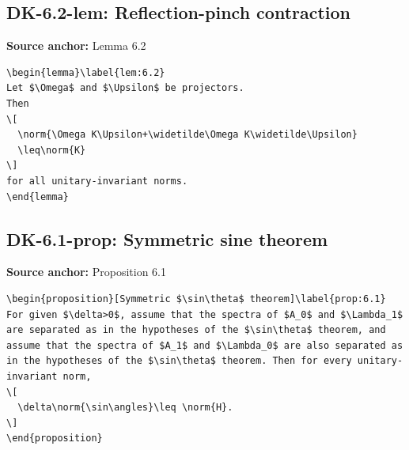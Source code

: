 \subsection*{DK-6.2-lem: Reflection-pinch contraction}
\noindent\textbf{Source anchor:} Lemma 6.2\\
\begin{verbatim}
\begin{lemma}\label{lem:6.2}
Let $\Omega$ and $\Upsilon$ be projectors.
Then
\[
  \norm{\Omega K\Upsilon+\widetilde\Omega K\widetilde\Upsilon}
  \leq\norm{K}
\]
for all unitary-invariant norms.
\end{lemma}
\end{verbatim}

\subsection*{DK-6.1-prop: Symmetric sine theorem}
\noindent\textbf{Source anchor:} Proposition 6.1\\
\begin{verbatim}
\begin{proposition}[Symmetric $\sin\theta$ theorem]\label{prop:6.1}
For given $\delta>0$, assume that the spectra of $A_0$ and $\Lambda_1$ are separated as in the hypotheses of the $\sin\theta$ theorem, and assume that the spectra of $A_1$ and $\Lambda_0$ are also separated as in the hypotheses of the $\sin\theta$ theorem. Then for every unitary-invariant norm,
\[
  \delta\norm{\sin\angles}\leq \norm{H}.
\]
\end{proposition}
\end{verbatim}

